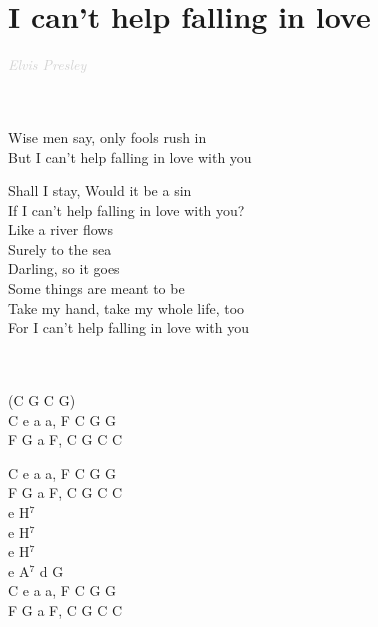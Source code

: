 \documentclass[a5paper, 10pt]{book}
\begin{document}
\section{I can't help falling in love}\textcolor{lightgray}{\textit{Elvis Presley}}\\~\\
\begin{minipage}[t]{0.8\textwidth}
  ~\\
Wise men say, only fools rush in\\
But I can't help falling in love with you\vspace*{1.8mm}

Shall I stay, Would it be a sin\\
If I can't help falling in love with you?\\

\hspace*{5mm}Like a river flows\\
\hspace*{5mm}Surely to the sea\\
\hspace*{5mm}Darling, so it goes\\
\hspace*{5mm}Some things are meant to be\\

Take my hand, take my whole life, too\\
For I can't help falling in love with you\\
~\\
~\\
\end{minipage}
\begin{minipage}[t]{0.2\textwidth}
  (C G C G)\\
  C e a a, F C G G\\
  F G a F, C G C C\vspace*{1.8mm}

  C e a a, F C G G\\
  F G a F, C G C C\\

  e H$^7$\\
  e H$^7$\\
  e H$^7$\\
  e A$^7$ d G\\

  C e a a, F C G G\\
  F G a F, C G C C\\

\end{minipage}
\end{document}
